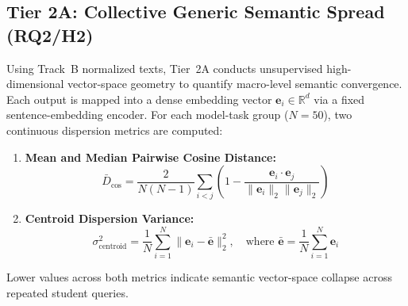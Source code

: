 \subsection{Tier 2A: Collective Generic Semantic Spread (RQ2/H2)}
Using Track~B normalized texts, Tier~2A conducts unsupervised high-dimensional vector-space geometry to quantify macro-level semantic convergence. Each output is mapped into a dense embedding vector $\mathbf{e}_i \in \mathbb{R}^d$ via a fixed sentence-embedding encoder. For each model-task group ($N = 50$), two continuous dispersion metrics are computed:
\begin{enumerate}
  \item \textbf{Mean and Median Pairwise Cosine Distance:}
  \begin{equation}
  \bar{D}_{\cos} = \frac{2}{N(N-1)} \sum_{i < j} \left(1 - \frac{\mathbf{e}_i \cdot \mathbf{e}_j}{\|\mathbf{e}_i\|_2 \|\mathbf{e}_j\|_2}\right)
  \end{equation}
  \item \textbf{Centroid Dispersion Variance:}
  \begin{equation}
  \sigma^2_{\text{centroid}} = \frac{1}{N} \sum_{i=1}^{N} \|\mathbf{e}_i - \bar{\mathbf{e}}\|_2^2, \quad \text{where } \bar{\mathbf{e}} = \frac{1}{N}\sum_{i=1}^{N} \mathbf{e}_i
  \end{equation}
\end{enumerate}
Lower values across both metrics indicate semantic vector-space collapse across repeated student queries.

